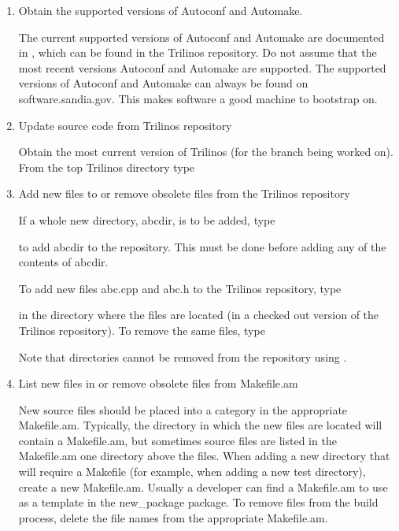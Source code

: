 \documentclass[12pt,relax]{TrilinosDevGuide}
\begin{document}
\begin{enumerate}
\item Obtain the supported versions of Autoconf and Automake.

The current supported versions of Autoconf and Automake are documented in   
, which can be found in 
the Trilinos repository.  Do not assume that the most recent versions Autoconf 
and Automake are supported.  The supported versions of Autoconf and 
Automake can always be found on software.sandia.gov.  This makes software a 
good machine to bootstrap on.

\item Update source code from Trilinos repository

Obtain the most current version of Trilinos (for the branch being worked on).  
From the top Trilinos directory type


\item Add new files to or remove obsolete files from the Trilinos repository

If a whole new directory, abcdir, is to be added, type 


to add abcdir to the repository.  This must be done before adding any of the 
contents of abcdir.

To add new files abc.cpp and abc.h to the Trilinos repository, type


in the directory where the files are located (in a checked out version of the 
Trilinos repository).  To remove the same files, type


Note that directories cannot be removed from the repository using 
.

 \item List new files in or remove obsolete files from Makefile.am

New source files should be placed into a category in the appropriate 
Makefile.am.  Typically, the directory in which the new files are located will 
contain a Makefile.am, but sometimes source files are listed in the 
Makefile.am one directory above the files.  When adding a new directory that 
will require a Makefile (for example, when adding a new test directory), 
create a new Makefile.am.  Usually a developer can find a Makefile.am to use 
as a template in the new\_package package.  To remove files from the build 
process, delete the file names from the appropriate Makefile.am.


\end{enumerate}
\end{document}
